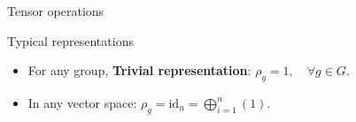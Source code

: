 \documentclass[handout,  12pt]{beamer}
\newcommand{\1}{\mathbf{1}}
\newcommand{\0}{\mathbf{0}}
\newcommand{\GL}{\text{GL}}
\newcommand{\id}{\text{id}}
\begin{document}
\begin{frame}{Tensor operations}
		
%
%	
%	
	\begin{frame}{Typical representations}
		\begin{itemize}
			\item For any group, \textbf{Trivial representation}: $\rho_g = 1, \quad \forall g \in G$.
			\item In any vector space: $\rho_g = \id_n = \bigoplus_{i=1}^{n} (1)$.

\end{itemize}
\end{frame}
\end{frame}
\end{document}

